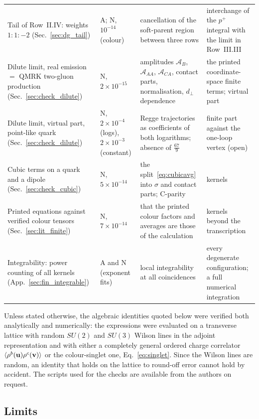 \begin{longtable}{@{}>{\raggedright\arraybackslash}p{}>{\raggedright\arraybackslash}p{}>{\raggedright\arraybackslash}p{}>{\raggedright\arraybackslash}p{}@{}}
Tail of Row~II.IV: weights $1:1:-2$ (Sec.~\ref{sec:dg_tail}) & A; N, $10^{-14}$ (colour) & cancellation of the soft-parent region between three rows & interchange of the $p^+$ integral with the limit in Row~III.III\\
Dilute limit, real emission $=$ QMRK two-gluon production (Sec.~\ref{sec:check_dilute}) & N, $2\times10^{-15}$ & amplitudes $\mathcal A_B$, $\mathcal A_{AA}$, $\mathcal A_{CA}$, contact parts, normalisation, $d_\perp$ dependence & the printed coordinate-space finite terms; virtual part\\
Dilute limit, virtual part, point-like quark (Sec.~\ref{sec:check_dilute}) & N, $2\times10^{-4}$ (logs), $2\times10^{-3}$ (constant) & Regge trajectories as coefficients of both logarithms; absence of $\frac{67}{9}$ & finite part against the one-loop vertex (open)\\
Cubic terms on a quark and a dipole (Sec.~\ref{sec:check_cubic}) & N, $5\times10^{-14}$ & the split~\eqref{eq:cubicavg} into $\sigma$ and contact parts; C-parity & kernels\\
Printed equations against verified colour tensors (Sec.~\ref{sec:lit_finite}) & N, $7\times10^{-14}$ & that the printed colour factors and averages are those of the calculation & kernels beyond the transcription\\
Integrability: power counting of all kernels (App.~\ref{sec:fin_integrable}) & A and N (exponent fits) & local integrability at all coincidences & every degenerate configuration; a full numerical integration\\
\end{longtable}
\endgroup

Unless stated otherwise, the algebraic identities quoted below were verified both analytically and numerically: the expressions were evaluated on a transverse lattice with random $SU(2)$ and $SU(3)$ Wilson lines in the adjoint representation and with either a completely general ordered charge correlator $\langle\rho^b(\mathbf{u})\rho^c(\mathbf{v})\rangle$ or the colour-singlet one, Eq.~\eqref{eq:singlet}. Since the Wilson lines are random, an identity that holds on the lattice to round-off error cannot hold by accident. The scripts used for the checks are available from the authors on request.

\subsection{Limits}\label{sec:limits}

